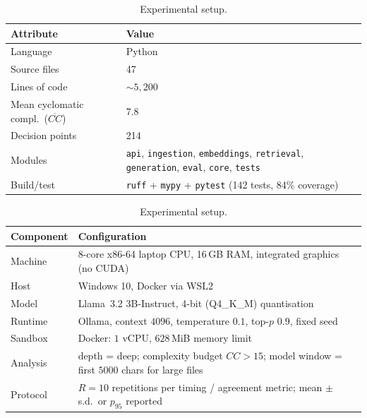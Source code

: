 \begin{table}[!tp]
  \centering
  \begin{minipage}[t]{0.47\textwidth}
    \centering
    \caption{Case-study subject: \textit{Vellum}, a
             retrieval-augmented generation service.}
    \label{tab:subject}
    \renewcommand{\arraystretch}{1.15}
    \small
    \begin{tabularx}{\linewidth}{@{}l X@{}}
      \toprule
      \textbf{Attribute} & \textbf{Value} \\
      \midrule
      Language              & Python \\
      Source files          & 47 \\
      Lines of code         & ${\sim}5{,}200$ \\
      Mean cyclomatic compl.\ ($\overline{CC}$) & 7.8 \\
      Decision points       & 214 \\
      Modules               & \texttt{api}, \texttt{ingestion},
                              \texttt{embeddings}, \texttt{retrieval},
                              \texttt{generation}, \texttt{eval},
                              \texttt{core}, \texttt{tests} \\
      Build/test            & \texttt{ruff} + \texttt{mypy} +
                              \texttt{pytest} (142 tests, 84\% coverage) \\
      \bottomrule
    \end{tabularx}
  \end{minipage}\hfill
  \begin{minipage}[t]{0.47\textwidth}
    \centering
    \caption{Experimental setup.}
    \label{tab:setup}
    \renewcommand{\arraystretch}{1.15}
    \small
    \begin{tabularx}{\linewidth}{@{}l X@{}}
      \toprule
      \textbf{Component} & \textbf{Configuration} \\
      \midrule
      Machine   & 8-core x86-64 laptop CPU, 16\,GB RAM, integrated
                  graphics (no CUDA) \\
      Host      & Windows 10, Docker via WSL2 \\
      Model     & \mbox{Llama 3.2} 3B-Instruct, 4-bit (Q4\_K\_M)
                  quantisation \\
      Runtime   & Ollama, context $4096$, temperature $0.1$,
                  top-$p$ $0.9$, fixed seed \\
      Sandbox   & Docker: $1$ vCPU, $628$\,MiB memory limit \\
      Analysis  & depth = deep; complexity budget $CC>15$; model window
                  = first $5000$ chars for large files \\
      Protocol  & $R=10$ repetitions per timing / agreement metric;
                  mean $\pm$ s.d.\ or $p_{95}$ reported \\
      \bottomrule
    \end{tabularx}
  \end{minipage}
\end{table}
